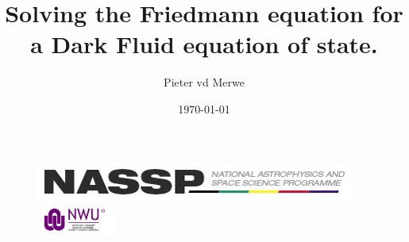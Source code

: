 \documentclass[8pt,hideothersubsections]{beamer}
\title{Solving the Friedmann equation for a Dark Fluid equation of state.}
\subtitle{}
\author{Pieter vd Merwe}
\institute{North-West University Centre for Space Research}
\date{\today}
\begin{document}
\begin{frame}
\titlepage
\begin{figure}[ht]
    \begin{minipage}{0.45\linewidth}
        \centering
        \includegraphics[width=\textwidth]{./Images/NASSP_logo.jpg}
    \end{minipage}
    \begin{minipage}{0.45\linewidth}
        \centering
        \includegraphics[width=\textwidth,height=30pt]{./Images/nwu_logo.jpg}
    \end{minipage}
\end{figure}
\end{frame}
\end{document}
